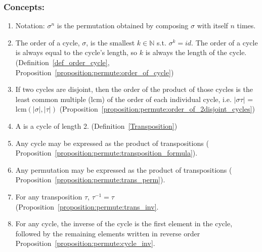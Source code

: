 \subsubsection*{Concepts:}
\begin{enumerate}
\item
Notation: $\sigma^n$ is the permutation obtained by composing $\sigma$ with itself $n$ times.
\item
The order of a cycle, $\sigma$, is the smallest $k \in {\mathbb N}$ s.t. $\sigma^k = id$.  The order of a cycle is always equal to the cycle's length, so $k$ is always the length of the cycle. (Definition~\ref{def_order_cycle}, Proposition~\ref{proposition:permute:order_of_cycle})
\item
If two cycles are disjoint, then the order of the product of those cycles is the least common multiple (lcm) of the order of each individual cycle, i.e. $|\sigma \tau|$ = lcm$(|\sigma|, |\tau|)$ (Proposition~\ref{proposition:permute:order_of_2disjoint_cycles})
\item
A  is a cycle of length 2. (Definition~\ref{Transposition})
\item
Any cycle may be expressed as the product of transpositions ( Proposition~\ref{proposition:permute:transposition_formula}).
\item
Any permutation may be expressed as the product of transpositions ( Proposition~\ref{proposition:permute:trans_perm}).
\item
For any transposition $\tau$, $\tau^{-1} = \tau$ (Proposition~\ref{proposition:permute:trans_inv}.
\item
For any cycle, the inverse of the cycle is the first element in the cycle, followed by the remaining elements written in reverse order Proposition~\ref{proposition:permute:cycle_inv}.
\end{enumerate}

